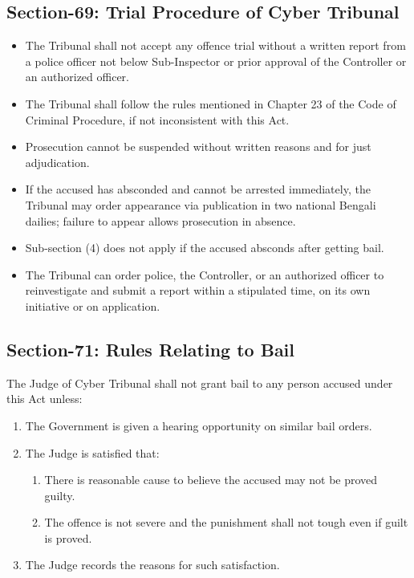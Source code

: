 \subsection{Section-69: Trial Procedure of Cyber Tribunal}
\begin{itemize}[parsep=0.5em]
	\item	The Tribunal shall not accept any offence trial without a written report from a police officer not below Sub-Inspector or prior approval of the Controller or an authorized officer.
	\item	The Tribunal shall follow the rules mentioned in Chapter 23 of the Code of Criminal Procedure, if not inconsistent with this Act.
	\item	Prosecution cannot be suspended without written reasons and for just adjudication.
	\item	If the accused has absconded and cannot be arrested immediately, the Tribunal may order appearance via publication in two national Bengali dailies; failure to appear allows prosecution in absence.
	\item	Sub-section (4) does not apply if the accused absconds after getting bail.
	\item	The Tribunal can order police, the Controller, or an authorized officer to reinvestigate and submit a report within a stipulated time, on its own initiative or on application.
\end{itemize}

\pagebreak
\subsection{Section-71: Rules Relating to Bail}
The Judge of Cyber Tribunal shall not grant bail to any person accused under this Act unless:  

\begin{enumerate}[itemsep=0.5em]
    \item The Government is given a hearing opportunity on similar bail orders.
    \item The Judge is satisfied that:
    \begin{enumerate}
        \item There is reasonable cause to believe the accused may not be proved guilty.
        \item The offence is not severe and the punishment shall not tough even if guilt is proved.
    \end{enumerate}
    \item The Judge records the reasons for such satisfaction.
\end{enumerate}

